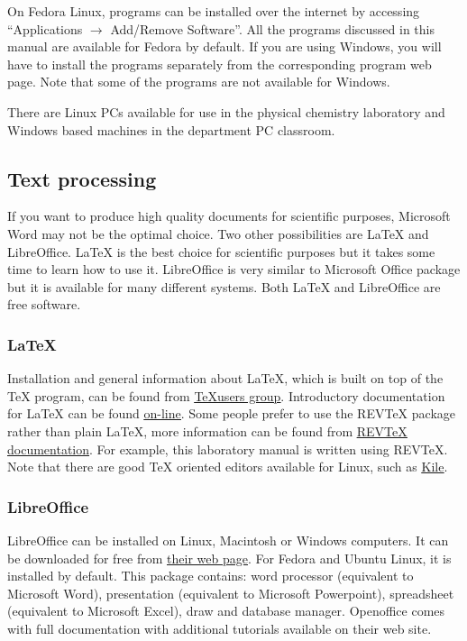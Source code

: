 \documentclass[byrevtex,amssymb,aps,pra,floatfix,letterpaper]{revtex4}
\begin{document}
On Fedora Linux, programs can be installed over the internet by accessing ``Applications $\rightarrow$ Add/Remove Software''. All the programs discussed in this manual are available for Fedora by default. If you are using Windows, you will have to install the programs separately from the corresponding program web page. Note that some of the programs are not available for Windows.

There are Linux PCs available for use in the physical chemistry laboratory and Windows based machines in the department PC classroom.

\subsection{Text processing}

If you want to produce high quality documents for scientific purposes, Microsoft Word may not be the optimal choice. Two other possibilities are \LaTeX{} and LibreOffice. \LaTeX{} is the best choice for scientific purposes but it takes some time to learn how to use it. LibreOffice is very similar to Microsoft Office package but it is available for many different systems. Both \LaTeX{} and LibreOffice are free software.

\subsubsection{\LaTeX}

Installation and general information about \LaTeX{}, which is built on top of the \TeX{} program, can be found from \href{http://www.tug.org/}{\underline{\TeX users group}}. Introductory documentation for \LaTeX{} can be found \href{http://www.ctan.org/tex-archive/info/lshort/english/lshort.pdf}{\underline{on-line}}. Some people prefer to use the REV\TeX{} package rather than plain \LaTeX{}, more information can be found from \href{http://authors.aps.org/revtex4/}{\underline{REV\TeX{} documentation}}. For example, this laboratory manual is written using REV\TeX{}. Note that there are good \TeX{} oriented editors available for Linux, such as \href{http://kile.sourceforge.net/}{\underline{Kile}}.

\subsubsection{LibreOffice}

LibreOffice can be installed on Linux, Macintosh or Windows computers. It can be downloaded for free from \href{http://www.openoffice.org/}{\underline{their web page}}. For Fedora and Ubuntu Linux, it is installed by default.
This package contains: word processor (equivalent to Microsoft Word), presentation (equivalent to Microsoft Powerpoint), spreadsheet (equivalent to Microsoft Excel), draw and database manager. Openoffice comes with full documentation with additional tutorials available on their web site.
\end{document}
